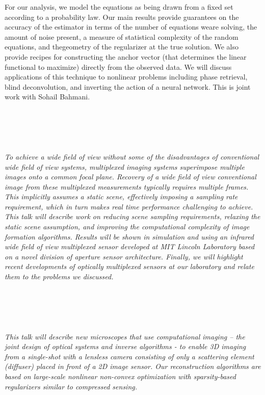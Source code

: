 \begin{multicols}{2}
{For our analysis, we model the equations as being drawn from a fixed set according to a probability law.  Our main results provide guarantees on the accuracy of the estimator in terms of the number of equations weare solving, the amount of noise present, a measure of statistical complexity of the random equations, and thegeometry of the regularizer at the true solution. We also provide recipes for constructing the anchor vector (that determines the linear functional to maximize) directly from the observed data.
We will discuss applications of this technique to nonlinear problems including phase retrieval, blind deconvolution, and inverting the action of a neural network.
This is joint work with Sohail Bahmani.
}\\
\\ 
        \\
        \\\\
\\
      \textit{To achieve a wide field of view without some of the disadvantages of conventional wide field of view systems, multiplexed imaging systems superimpose multiple images onto a common focal plane. Recovery of a wide field of view conventional image from these multiplexed measurements typically requires multiple frames. This implicitly assumes a static scene, effectively imposing a sampling rate requirement, which in turn makes real time performance challenging to achieve. This talk will describe work on reducing scene sampling requirements, relaxing the static scene assumption, and improving the computational complexity of image formation algorithms. Results will be shown in simulation and using an infrared wide field of view multiplexed sensor developed at MIT Lincoln Laboratory based on a novel division of aperture sensor architecture. Finally, we will highlight recent developments of optically multiplexed sensors at our laboratory and relate them to the problems we discussed.}\\
\\ 
        \\
        \\\\
\\
      \textit{This talk will describe new microscopes that use computational imaging – the joint design of optical systems and inverse algorithms - to enable 3D imaging from a single-shot with a lensless camera consisting of only a scattering element (diffuser) placed in front of a 2D image sensor. Our reconstruction algorithms are based on large-scale nonlinear non-convex optimization with sparsity-based regularizers similar to compressed sensing. }\\

\end{multicols}
